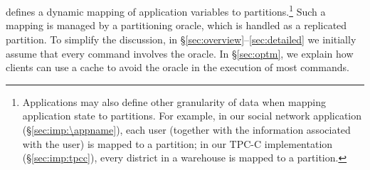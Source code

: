 \section{\dynastar}
\label{sec:dynastar}

%
%



\dynastar defines a dynamic mapping of application variables to partitions.\footnote{Applications may also define other granularity of data when mapping application state to partitions. For example, in our social network application (\S\ref{sec:imp:\appname}), each user (together with the information associated with the user) is mapped to a partition; in our TPC-C implementation (\S\ref{sec:imp:tpcc}), every district in a warehouse is mapped to a partition.}
Such a mapping is managed by a partitioning oracle, which is handled as a replicated partition.
To simplify the discussion, in \S\ref{sec:overview}--\ref{sec:detailed} we initially assume that every command involves the oracle.
In \S\ref{sec:optm}, we explain how clients can use a cache to avoid the oracle in the execution of most commands.

